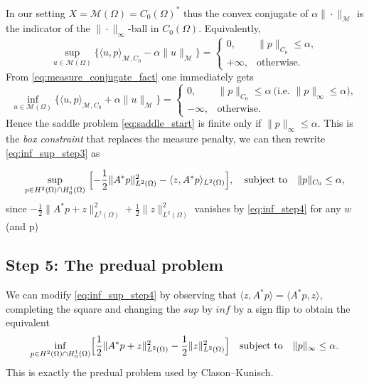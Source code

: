\documentclass[11pt,a4paper]{article}
\begin{document}
In our setting $X=\mathcal{M}(\Omega)=C_0(\Omega)^*$ thus the convex conjugate of $\alpha\|\cdot\|_{\mathcal{M}}$ is the indicator
of the $\|\cdot\|_\infty$-ball in $C_0(\Omega)$.
Equivalently,
\begin{equation}\label{eq:measure_conjugate_fact}
\sup_{u\in\mathcal{M}(\Omega)} \bigl\{\langle u,p\rangle_{\mathcal{M},C_0} - \alpha\|u\|_{\mathcal{M}}\bigr\}
=
\begin{cases}
0, & \|p\|_{C_0}\le \alpha,\\
+\infty, & \text{otherwise}.
\end{cases}
\end{equation}
From \eqref{eq:measure_conjugate_fact} one immediately gets
\begin{equation}
\inf_{u\in\mathcal{M}(\Omega)} \bigl\{\langle u,p\rangle_{\mathcal{M},C_0} + \alpha\|u\|_{\mathcal{M}}\bigr\}
=
\begin{cases}
0, & \|p\|_{C_0}\le \alpha \ \text{(i.e.\ $\|p\|_\infty\le \alpha$)},\\
-\infty, & \text{otherwise}.
\end{cases}\label{eq:inf_step4}
\end{equation}
Hence the saddle problem \eqref{eq:saddle_start} is finite only if $\|p\|_\infty\le \alpha$.
This is the \emph{box constraint} that replaces the measure penalty, we can then rewrite \ref{eq:inf_sup_step3} as

\begin{equation}\label{eq:inf_sup_step4}
\sup_{p\in H^2(\Omega)\cap H^1_0(\Omega)}\
\Bigl[
-\frac12\|A^*p\|_{L^2(\Omega)}^2
-\langle z,A^*p\rangle_{L^2(\Omega)}
\Bigr], \quad \textrm{subject to} \quad \|p\|_{C_0}\le \alpha, 
\end{equation}
since $-\frac12\|A^*p+z\|_{L^2(\Omega)}^2
+\frac12\|z\|_{L^2(\Omega)}^2$ vanishes by \eqref{eq:inf_step4} for any $w$ (and p)

\subsection*{Step 5: The predual problem}
We can modify \ref{eq:inf_sup_step4} by observing that $\langle z,A^*p\rangle = \langle A^*p,z\rangle$, completing the square and changing the $sup$ by $inf$ by a sign flip to obtain the equivalent 
\begin{equation}\label{eq:predual_final}
\inf_{p\in H^2(\Omega)\cap H^1_0(\Omega)}
\Bigl[\frac12\|A^*p+z\|_{L^2(\Omega)}^2-\frac12\|z\|_{L^2(\Omega)}^2\Bigr]
\quad\text{subject to}\quad \|p\|_\infty\le \alpha.
\end{equation}
This is exactly the predual problem used by Clason--Kunisch.
\end{document}
